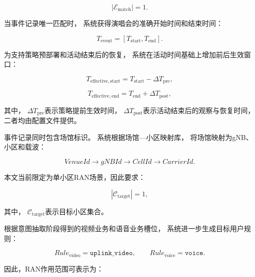 \documentclass[lang=cn,12pt]{elegantbook}
\begin{document}
\begin{equation}
\left|
\mathcal{E}_{\mathrm{match}}
\right|
=
1.
\label{eq:unique_event_requirement}
\end{equation}

当事件记录唯一匹配时，
系统获得演唱会的准确开始时间和结束时间：

\begin{equation}
T_{\mathrm{event}}
=
\left[
T_{\mathrm{start}},
T_{\mathrm{end}}
\right].
\label{eq:event_time_scope}
\end{equation}

为支持策略预部署和活动结束后的恢复，
系统在活动时间基础上增加前后生效窗口：

\begin{equation}
T_{\mathrm{effective,start}}
=
T_{\mathrm{start}}
-
\Delta T_{\mathrm{pre}},
\label{eq:policy_effective_start}
\end{equation}

\begin{equation}
T_{\mathrm{effective,end}}
=
T_{\mathrm{end}}
+
\Delta T_{\mathrm{post}},
\label{eq:policy_effective_end}
\end{equation}

其中，
$\Delta T_{\mathrm{pre}}$表示策略提前生效时间，
$\Delta T_{\mathrm{post}}$表示活动结束后的观察与恢复时间，
二者均由配置文件提供。

事件记录同时包含场馆标识。
系统根据场馆—小区映射库，
将场馆映射为gNB、小区和载波：

\begin{equation}
VenueId
\rightarrow
gNBId
\rightarrow
CellId
\rightarrow
CarrierId.
\label{eq:venue_ran_mapping}
\end{equation}

本文当前限定为单小区RAN场景，因此要求：

\begin{equation}
\left|
\mathcal{C}_{\mathrm{target}}
\right|
=
1,
\label{eq:single_cell_scope}
\end{equation}

其中，
$\mathcal{C}_{\mathrm{target}}$表示目标小区集合。

根据意图抽取阶段得到的视频业务和语音业务槽位，
系统进一步生成目标用户规则：

\begin{equation}
Rule_{\mathrm{video}}
=
\texttt{uplink\_video},
\qquad
Rule_{\mathrm{voice}}
=
\texttt{voice}.
\label{eq:translated_user_rules}
\end{equation}

因此，RAN作用范围可表示为：
\end{document}
